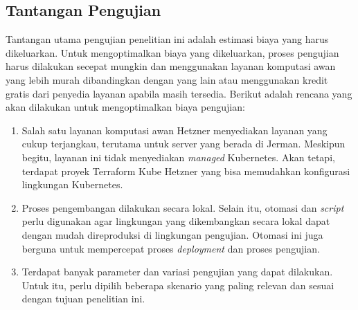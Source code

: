 \subsection{Tantangan Pengujian}

Tantangan utama pengujian penelitian ini adalah estimasi biaya yang harus dikeluarkan. Untuk mengoptimalkan biaya yang dikeluarkan, proses pengujian harus dilakukan secepat mungkin dan menggunakan layanan komputasi awan yang lebih murah dibandingkan dengan yang lain atau menggunakan kredit gratis dari penyedia layanan apabila masih tersedia. Berikut adalah rencana yang akan dilakukan untuk mengoptimalkan biaya pengujian:

\begin{enumerate}
    \item Salah satu layanan komputasi awan Hetzner menyediakan layanan yang cukup terjangkau, terutama untuk server yang berada di Jerman. Meskipun begitu, layanan ini tidak menyediakan \textit{managed} Kubernetes. Akan tetapi, terdapat proyek Terraform Kube Hetzner yang bisa memudahkan konfigurasi lingkungan Kubernetes.
    \item Proses pengembangan dilakukan secara lokal. Selain itu, otomasi dan \textit{script} perlu digunakan agar lingkungan yang dikembangkan secara lokal dapat dengan mudah direproduksi di lingkungan pengujian. Otomasi ini juga berguna untuk mempercepat proses \textit{deployment} dan proses pengujian.
    \item Terdapat banyak parameter dan variasi pengujian yang dapat dilakukan. Untuk itu, perlu dipilih beberapa skenario yang paling relevan dan sesuai dengan tujuan penelitian ini.
\end{enumerate}